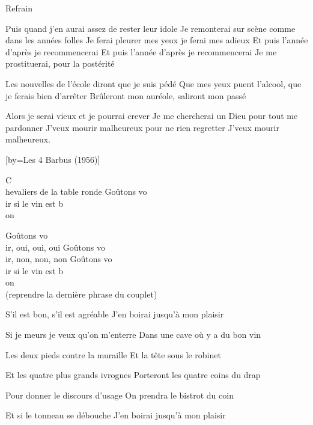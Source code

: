 	Refrain

\beginverse
Puis quand j'en aurai assez de rester leur idole
Je remonterai sur scène comme dans les années folles
Je ferai pleurer mes yeux je ferai mes adieux
Et puis l'année d'après je recommencerai
Et puis l'année d'après je recommencerai
Je me prostituerai, pour la postérité
\endverse

\beginverse
Les nouvelles de l'école diront que je suis pédé
Que mes yeux puent l'alcool, que je ferais bien d'arrêter
Brûleront mon auréole, saliront mon passé
\endverse

\beginverse
Alors je serai vieux et je pourrai crever
Je me chercherai un Dieu pour tout me pardonner
J'veux mourir malheureux pour ne rien regretter
J'veux mourir malheureux.
\endverse

[by={Les 4 Barbus (1956)}]

\beginverse
C\\[Do]hevaliers de la table ronde
Goûtons vo\\[Sol7]ir si le vin est b\\[Do]on
\\[bis]
\endverse

\beginverse
Goûtons vo\\[Fa]ir, oui, oui, oui
Goûtons vo\\[Do]ir, non, non, non
Goûtons vo\\[Sol7]ir si le vin est b\\[Do]on
\\[bis] (reprendre la dernière phrase du couplet)
\endverse

\beginverse
S'il est bon, s'il est agréable
J'en boirai jusqu'à mon plaisir
\\[bis]
\endverse

\beginverse
Si je meurs je veux qu'on m'enterre
Dans une cave où y a du bon vin
\\[bis]
\endverse

\beginverse
Les deux pieds contre la muraille
Et la tête sous le robinet
\\[bis]
\endverse

\beginverse
Et les quatre plus grands ivrognes
Porteront les quatre coins du drap
\\[bis]
\endverse

\beginverse
Pour donner le discours d'usage
On prendra le bistrot du coin
\\[bis]
\endverse

\beginverse
Et si le tonneau se débouche
J'en boirai jusqu'à mon plaisir
\\[bis]
\endverse

